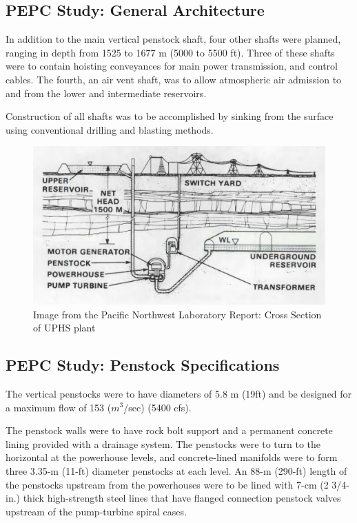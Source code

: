 \documentclass[hidelinks,12pt,a4paper]{article}
\begin{document}
\subsection{PEPC Study: General Architecture}
In addition to the main vertical penstock shaft, four
other shafts were planned, ranging in depth from 1525 to 1677 m (5000
to 5500 ft). Three of these shafts were to contain hoisting conveyances for main power transmission, and control cables. The fourth, an air vent shaft, was to allow atmospheric air admission to and from the lower and intermediate reservoirs.

Construction of all shafts was to be accomplished by sinking from the surface using conventional drilling and blasting methods.

\begin{figure}[ht!]
    \centering
    \includegraphics[width=.75\textwidth]{pnl-report-diagram-1.png}
    \caption{Image from the Pacific Northwest Laboratory Report: Cross Section of UPHS plant \cite{UndergroundPumpedHydroelectricStorage}}
\end{figure}
\FloatBarrier

\subsection{PEPC Study: Penstock Specifications}
The vertical penstocks were to have diameters of 5.8 m (19ft) and be designed for a maximum flow of 153 ($m^3$/sec) (5400 cfs).

The penstock walls were to have rock bolt support and a permanent concrete lining provided with a drainage system. The penstocks were to turn to the horizontal at the powerhouse levels, and concrete-lined manifolds were to form three 3.35-m (11-ft) diameter penstocks at each level. An 88-m (290-ft) length of the penstocks upstream from the powerhouses were to be lined with 7-cm (2 3/4-in.) thick high-strength steel lines that have flanged connection penstock valves upstream of the pump-turbine spiral cases.
\end{document}
